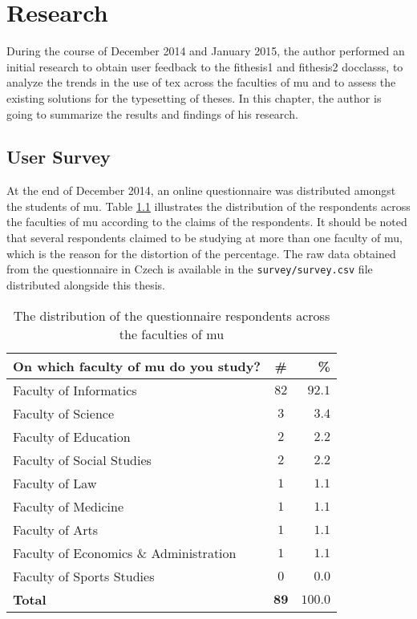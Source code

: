 \documentclass[12pt,twoside,cover,color,table]%
  {fithesis3/fithesis3/fithesis3} %
\begin{document}
\chapter{Research}
  During the course of December 2014 and January 2015, the author
  performed an initial research to obtain user feedback to the
  \textsf{fithesis1} and \textsf{fithesis2} \glspl{docclass}, to
  analyze the trends in the use of \gls{tex} across the faculties
  of \gls{mu} and to assess the existing solutions for the
  typesetting of theses. In this chapter, the author is going to
  summarize the results and findings of his research.

  \section{User Survey}
  At the end of December 2014, an online questionnaire was
  distributed amongst the students of \gls{mu}. Table
  \ref{table:survey-faculty} illustrates the distribution of the
  respondents across the faculties of \gls{mu} according to the
  claims of the respondents. It should be noted that several
  respondents claimed to be studying at more than one faculty of
  \gls{mu}, which is the reason for the distortion of the
  percentage. The raw data obtained from the questionnaire in Czech
  is available in the \texttt{survey/survey.csv} file distributed
  alongside this thesis.

  \begin{table}[!bt]
    \caption{The distribution of the questionnaire
      respondents across the faculties of \acrshort{mu}}
    \begin{tabularx}{\textwidth}{Xcr} \textbf{On which faculty of
      \gls{mu} do you study?} & \textbf{\#} & \textbf{\%}
      \\ \toprule Faculty of Informatics                  & $82$
      & $92.1$ \\ Faculty of Science                      &  $3$
      &  $3.4$ \\ Faculty of Education                    &  $2$
      &  $2.2$ \\ Faculty of Social Studies               &  $2$
      &  $2.2$ \\ Faculty of Law                          &  $1$
      &  $1.1$ \\ Faculty of Medicine                     &  $1$
      &  $1.1$ \\ Faculty of Arts                         &  $1$
      &  $1.1$ \\ Faculty of Economics \& Administration  &  $1$
      &  $1.1$ \\ Faculty of Sports Studies               &  $0$
      &  $0.0$ \\ \bottomrule \textbf{Total}      &$\mathbf{89}$
      & $\mathbf{100.0}$
    \end{tabularx}
    \label{table:survey-faculty}
  \end{table}
\end{document}
